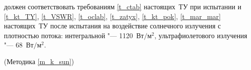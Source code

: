 \dut должен соответствовать требованиям \ref{t_ctab} настоящих~ТУ при испытании и  \ref{t_kt_TY}, \ref{t_VSWR}, \ref{t_oclab}, \ref{t_zatyx},   \ref{t_kt_pok}, \ref{t_mar_mar} настоящих~ТУ после испытания на воздействие солнечного излучения с плотностью потока: интегральной "--- 1120~$Вт/м^2$, ультрафиолетового излучения "--- 68~$Вт/м^2$.

\begin{flushright}
(Методика  \ref{m_k_sun})
\end{flushright}

